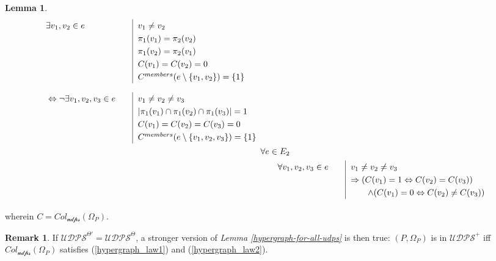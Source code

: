 \documentclass[11pt, oneside]{article}      %
\theoremstyle{definition}
\newtheorem{lem}{Lemma}
\numberwithin{equation}{section}
\newtheorem*{remark}{Remark}
\newcommand{\reff}[1]{(\ref{#1})}
\theoremstyle{c}
\begin{document}
\begin{lem}
\begin{alignat}{2}
\begin{aligned}
&\qquad \exists v_1, v_2 \in e & \quad &  \begin{aligned}[t] \renewcommand\arraystretch{1.25}\begin{array}[t]{|@{\hskip0.6em}l}
v_1 \not = v_2 \\
\pi_1(v_1) = \pi_2(v_2) \\
\pi_1(v_2) = \pi_2(v_1) \\
 C(v_1) = C(v_2) = 0 \\
 C^{members}(e \setminus \{v_1,v_2\}) = \{1\} \\
\end{array}
\end{aligned} \\[1.5ex]
& \qquad \Leftrightarrow \neg \exists v_1, v_2, v_3 \in e & \quad &  \begin{aligned}[t] \renewcommand\arraystretch{1.25}\begin{array}[t]{|@{\hskip0.6em}l}
v_1 \not = v_2  \not= v_3 \\
|\pi_1(v_1) \cap \pi_1(v_2) \cap \pi_1(v_3)| = 1 \\
 C(v_1) = C(v_2) = C(v_3) = 0 \\
 C^{members}(e \setminus \{v_1,v_2,v_3\}) = \{1\}
\end{array}
\end{aligned}
\end{aligned} \\
&\begin{aligned}
\label{hypergraph_law2}
&\forall e \in E_2\\
&\qquad \forall v_1,v_2,v_3 \in e & \quad &  \begin{aligned}[t] \renewcommand\arraystretch{1.25}\begin{array}[t]{|@{\hskip0.6em}l}
v_1 \not= v_2 \not= v_3 \\
\Rightarrow ( C(v_1) = 1 \Leftrightarrow C(v_2) = C(v_3) )\\
\qquad \land ( C(v_1) = 0 \Leftrightarrow C(v_2) \not= C(v_3) )\\
\end{array}
\end{aligned} \\[1.5ex]
\end{aligned}
\end{alignat}
wherein $C = Col_{\mathscr{udps}}(\Omega_P)$.
\end{lem}

\begin{remark}
If $\mathscr{UDPS}^{\Theta\prime} = \mathscr{UDPS}^{\Theta}$, a stronger version of \textit{Lemma \ref{hypergraph-for-all-udps}} is then true: $(P,\Omega_P)$ is in $\mathscr{UDPS}^+$ iff $Col_{\mathscr{udps}}(\Omega_P)$ satisfies \reff{hypergraph_law1} and \reff{hypergraph_law2}.
\end{remark}
\end{document}
